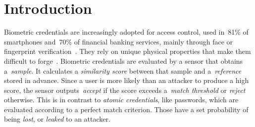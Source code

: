 \documentclass[conference,compsoc]{IEEEtran}
\begin{document}
\section{Introduction}
\newcommand{\FAR}{\ensuremath{\textit{FAR}}\xspace}
\newcommand{\FRR}{\ensuremath{\textit{FRR}}\xspace}
\newcommand{\EER}{\ensuremath{\textit{EER}}\xspace}
\newcommand{\ANDintegration}{\ensuremath{
P^{\text{AND}}_{\text{success}}(t)
=
\bigl(1-\FRR(t)\bigr)
\Bigl(
P^{1}_{\text{safe}}
+
P^{1}_{\text{leak}}\bigl(1-\FAR(t)\bigr)
\Bigr)
}\xspace}
\newcommand{\ORintegration}{\ensuremath{
    P^{\text{OR}}_{\text{success}}(t)
=
\bigl(1-\FAR(t)\bigr)
\Bigl(
P^{1}_{\text{safe}}
+
P^{1}_{\text{loss}}\bigl(1-\FRR(t)\bigr)
\Bigr)
}\xspace}
\newcommand{\Psuccess}{\ensuremath{
P_{\text{success}}(t)=
\begin{cases}
P^{1}_{\text{safe}}, 
& t \le a_1, \\[10pt]

(P^{1}_{\text{safe}} + P^{1}_{\text{leak}})
- P^{1}_{\text{leak}}\,\dfrac{a_2 - t}{a_2 - a_1}, 
& a_1 < t \le u_1, \\[14pt]

\dfrac{u_2 - t}{u_2 - u_1}
\left[
(P^{1}_{\text{safe}} + P^{1}_{\text{leak}})
- P^{1}_{\text{leak}}\,\dfrac{a_2 - t}{a_2 - a_1}
\right],
& u_1 < t \le a_2, \\[16pt]

\dfrac{u_2 - t}{u_2 - u_1}
(P^{1}_{\text{safe}} + P^{1}_{\text{leak}}),
& a_2 < t \le u_2, \\[12pt]

0, 
& t > u_2
\end{cases}
}\xspace}
\newcommand{\contprobabilities}{
\begin{align*}
P^{2}_{\text{safe}}(t) &= 1 - \FAR(t) - \FRR(t) + \FAR(t) \cdot \FRR(t),\\
P^{2}_{\text{loss}}(t) &= \FRR(t)\bigl(1 - \FAR(t)\bigr),\\
P^{2}_{\text{leak}}(t) &= \FAR(t)\bigl(1 - \FRR(t)\bigr),\\
P^{2}_{\text{theft}}(t) &= \FAR(t) \cdot \FRR(t).
\end{align*}
}
Biometric credentials are increasingly adopted for access control, used in~81\% of smartphones and~70\% of financial banking services, mainly through face or fingerprint verification~\cite{most_smartphones_biometric,financial_biometric}. They rely on unique physical properties that make them difficult to forge~\cite{biometric_importance}. Biometric credentials are evaluated by a sensor that obtains a~\emph{sample}. It calculates a \emph{similarity score} between that sample and a~\emph{reference} stored in advance. Since a user is more likely than an attacker to produce a high score, the sensor outputs~\emph{accept} if the score exceeds a~\emph{match threshold} or \emph{reject} otherwise. This is in contrast to \emph{atomic credentials}, like passwords, which are evaluated according to a perfect match criterion. Those have a set probability of being \emph{lost}, or \emph{leaked} to an attacker.
\end{document}

